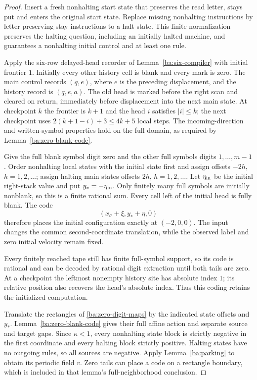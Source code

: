 \begin{proof}\label{ba:periodic-parking-proof}
Insert a fresh nonhalting start state that preserves the read letter,
stays put and enters the original start state.  Replace missing
nonhalting instructions by letter-preserving stay instructions to a halt
state.  This finite normalization preserves the halting question,
including an initially halted machine, and guarantees a nonhalting
initial control and at least one rule.

Apply the six-row delayed-head recorder of Lemma~\ref{ba:six-compiler}
with initial frontier $1$.  Initially every other history cell is blank
and every mark is zero.  The main control records $(q,e)$, where $e$
is the preceding displacement, and the history record is $(q,e,a)$.
The old head is marked before the right scan and cleared on return,
immediately before displacement into the next main state.  At checkpoint
$k$ the frontier is $k+1$ and the head $i$ satisfies $|i|\le k$;
the next checkpoint uses $2(k+1-i)+3\le4k+5$ local steps.  The
incoming-direction and written-symbol properties hold on the full
domain, as required by Lemma~\ref{ba:zero-blank-code}.

Give the full blank symbol digit zero and the other full symbols digits
$1,\ldots,m-1$.  Order nonhalting local states with the initial state
first and assign offsets $-2h$, $h=1,2,\ldots$; assign halting main
states offsets $2h$, $h=1,2,\ldots$.  Let $\eta_{\rm in}$ be the
initial right-stack value and put $y_*=-\eta_{\rm in}$.  Only finitely
many full symbols are initially nonblank, so this is a finite rational
sum.  Every cell left of the initial head is fully blank.  The code
\[
 (x_\sigma+\xi,y_*+\eta,0)
\]
therefore places the initial configuration exactly at $(-2,0,0)$.
The input changes the common second-coordinate translation, while the
observed label and zero initial velocity remain fixed.

Every finitely reached tape still has finite full-symbol support, so its
code is rational and can be decoded by rational digit extraction until
both tails are zero.  At a checkpoint the leftmost nonempty history site
has absolute index $1$; its relative position also recovers the head's
absolute index.  Thus this coding retains the initialized computation.

Translate the rectangles of \eqref{ba:zero-digit-maps} by the indicated
state offsets and $y_*$.  Lemma~\ref{ba:zero-blank-code} gives their
full affine action and separate source and target gaps.  Since
$\kappa<1$, every nonhalting state block is strictly negative in the
first coordinate and every halting block strictly positive.  Halting
states have no outgoing rules, so all sources are negative.  Apply
Lemma~\ref{ba:parking} to obtain its periodic field $v$.  Zero tails
can place a code on a rectangle boundary, which is included in that
lemma's full-neighborhood conclusion.


\end{proof}
